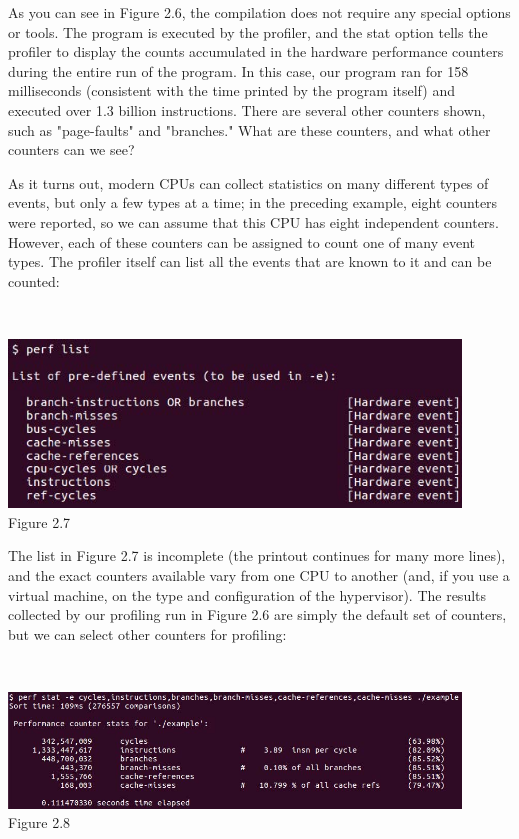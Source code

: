 As you can see in Figure 2.6, the compilation does not require any special options or tools. The program is executed by the profiler, and the stat option tells the profiler to display the counts accumulated in the hardware performance counters during the entire run of the program. In this case, our program ran for 158 milliseconds (consistent with the time printed by the program itself) and executed over 1.3 billion instructions. There are several other counters shown, such as "page-faults" and "branches." What are these counters, and what other counters can we see?

As it turns out, modern CPUs can collect statistics on many different types of events, but only a few types at a time; in the preceding example, eight counters were reported, so we can assume that this CPU has eight independent counters. However, each of these counters can be assigned to count one of many event types. The profiler itself can list all the events that are known to it and can be counted:

\hspace*{\fill} \\ %
\begin{center}
\includegraphics[width=0.9\textwidth]{content/1/chapter2/images/7.jpg}\\
Figure 2.7
\end{center}

The list in Figure 2.7 is incomplete (the printout continues for many more lines), and the exact counters available vary from one CPU to another (and, if you use a virtual machine, on the type and configuration of the hypervisor). The results collected by our profiling run in Figure 2.6 are simply the default set of counters, but we can select other counters for profiling:

\hspace*{\fill} \\ %
\begin{center}
\includegraphics[width=0.9\textwidth]{content/1/chapter2/images/8.jpg}\\
Figure 2.8
\end{center}

